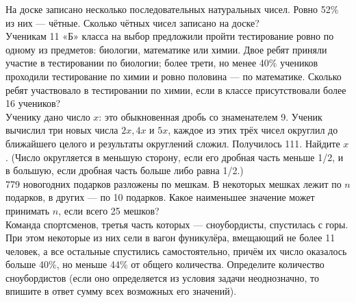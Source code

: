   На доске записано несколько последовательных натуральных
чисел. Ровно 52\% из них — чётные. Сколько чётных чисел записано на доске?\\

 Ученикам 11 «Б» класса на выбор предложили пройти тестирование ровно по одному из предметов: биологии, математике или химии. Двое ребят приняли участие в
тестировании по биологии; более трети, но менее 40\% учеников проходили тестирование по химии и ровно половина — по математике. Сколько ребят участвовало в тестировании по химии,
если в классе присутствовали более 16 учеников?
\\

 Ученику дано число $x$: это обыкновенная дробь со знаменателем 9. Ученик вычислил три новых числа $2x, 4x$ и $5x$, каждое из этих трёх чисел округлил
до ближайшего целого и результаты округлений сложил. Получилось 111. Найдите $x$. (Число
округляется в меньшую сторону, если его дробная часть меньше 1/2, и в большую, если дробная
часть больше либо равна 1/2.)\\

 779 новогодних подарков разложены по мешкам. В некоторых мешках
лежит по $n$ подарков, в других — по 10 подарков. Какое наименьшее значение может принимать $n$, если всего 25 мешков?\\

 Команда спортсменов, третья часть которых — сноубордисты,
спустилась с горы. При этом некоторые из них сели в вагон фуникулёра, вмещающий не более
11 человек, а все остальные спустились самостоятельно, причём их число оказалось больше
40\%, но меньше 44\% от общего количества. Определите количество сноубордистов (если оно
определяется из условия задачи неоднозначно, то впишите в ответ сумму всех возможных его
значений).

